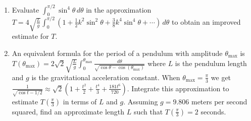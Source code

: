 \documentclass{exercises}
\begin{document}
\begin{enumerate}[resume]
\item Evaluate $\int_{0}^{\pi/2}\sin^{4}\theta \,d\theta$ in the approximation $T=4\sqrt{\frac{L}{g}}\int_{0}^{\pi/2}(1+\frac{1}{2}k^{2}\sin^{2}\theta+\frac{3}{8}k^{4}\sin^{4}\theta+\cdots)\,d\theta$ to obtain an improved estimate for $T$.
\item \techrequired An equivalent formula for the period of a pendulum with amplitude $\theta_{\text{max}}$ is $T(\theta_{\text{max}})=2\sqrt{2}\sqrt{\frac{L}{g}}\int_{0}^{\theta_{\text{max}}}\frac{d\theta}{\sqrt{\cos \theta-\cos(\theta_{\text{max}})}}$ where $L$ is the pendulum length and $g$ is the gravitational acceleration constant. When $\theta_{\text{max}}=\frac{\pi}{3}$ we get $\frac{1}{\sqrt{\cos t-1/2}}\approx \sqrt{2}(1+\frac{t^{2}}{2}+\frac{t^{4}}{3}+\frac{181t^{6}}{720})$. Integrate this approximation to estimate $T(\frac{\pi}{3})$ in terms of $L$ and $g$. Assuming $g=9.806$ meters per second squared, find an approximate length $L$ such that $T(\frac{\pi}{3})=2$ seconds.
\end{enumerate}
\end{document}
